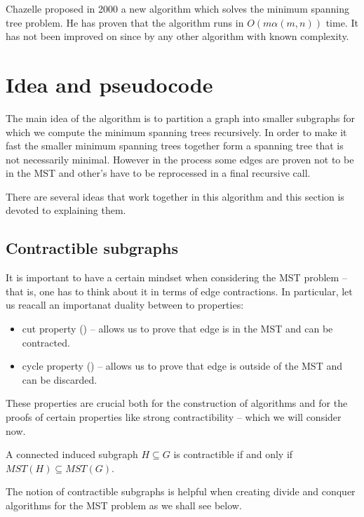 Chazelle \cite{C2000} proposed in 2000 a new algorithm which solves the minimum spanning tree problem.  He has proven that the algorithm runs in $O(m\alpha(m,n))$ time. It has not been improved on since by any other algorithm with known complexity.

\section{Idea and pseudocode}
The main idea of the algorithm is to partition a graph into smaller subgraphs for which we compute the minimum spanning trees recursively. In order to make it fast the smaller minimum spanning trees together form a spanning tree that is not necessarily minimal. However in the process some edges are proven not to be in the MST and other's have to be reprocessed in a final recursive call.

There are several ideas that work together in this algorithm and this section is devoted to explaining them.

\subsection{Contractible subgraphs}

 It is important to have a certain mindset when considering the MST problem -- that is, one has to think about it in terms of edge contractions. In particular, let us reacall an importanat duality between to properties:
 \begin{itemize}
     \item cut property () -- allows us to prove that edge is in the MST and can be contracted.
     \item cycle property () -- allows us to prove that edge is outside of the MST and can be discarded.
 \end{itemize}
These properties are crucial both for the construction of algorithms and for the proofs of certain properties like strong contractibility -- which we will consider now. 

\begin{definition} 
A connected induced subgraph $H \subseteq G$ is contractible if and only if $MST(H) \subseteq MST(G)$.
\end{definition}

The notion of contractible subgraphs is helpful when creating divide and conquer algorithms for the MST problem as we shall see below.

